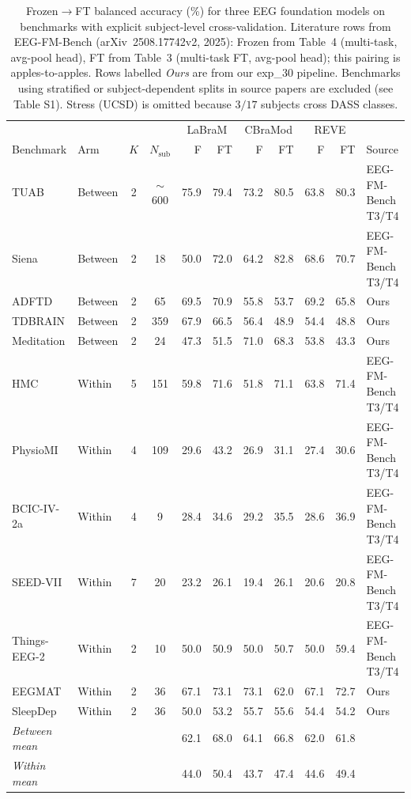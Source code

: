 \begin{table}[t]
\centering
\caption{Frozen$\rightarrow$FT balanced accuracy (\%) for three EEG foundation models on benchmarks with explicit subject-level cross-validation. Literature rows from EEG-FM-Bench (arXiv~2508.17742v2, 2025): Frozen from Table~4 (multi-task, avg-pool head), FT from Table~3 (multi-task FT, avg-pool head); this pairing is apples-to-apples. Rows labelled \emph{Ours} are from our exp\_30 pipeline. Benchmarks using stratified or subject-dependent splits in source papers are excluded (see Table S1). Stress (UCSD) is omitted because $3/17$ subjects cross DASS classes.}
\label{tab:benchmark_gap}
\begin{tabular}{llccrrrrrrl}
\toprule
 & & & & \multicolumn{2}{c}{LaBraM} & \multicolumn{2}{c}{CBraMod} & \multicolumn{2}{c}{REVE} & \\
\cmidrule(lr){5-6}\cmidrule(lr){7-8}\cmidrule(lr){9-10}
Benchmark & Arm & $K$ & $N_{\mathrm{sub}}$ & F & FT & F & FT & F & FT & Source \\
\midrule
TUAB & Between & 2 & $\sim$600 & 75.9 & 79.4 & 73.2 & 80.5 & 63.8 & 80.3 & EEG-FM-Bench T3/T4 \\
Siena & Between & 2 & 18 & 50.0 & 72.0 & 64.2 & 82.8 & 68.6 & 70.7 & EEG-FM-Bench T3/T4 \\
ADFTD & Between & 2 & 65 & 69.5 & 70.9 & 55.8 & 53.7 & 69.2 & 65.8 & Ours \\
TDBRAIN & Between & 2 & 359 & 67.9 & 66.5 & 56.4 & 48.9 & 54.4 & 48.8 & Ours \\
Meditation & Between & 2 & 24 & 47.3 & 51.5 & 71.0 & 68.3 & 53.8 & 43.3 & Ours \\
\midrule
HMC & Within & 5 & 151 & 59.8 & 71.6 & 51.8 & 71.1 & 63.8 & 71.4 & EEG-FM-Bench T3/T4 \\
PhysioMI & Within & 4 & 109 & 29.6 & 43.2 & 26.9 & 31.1 & 27.4 & 30.6 & EEG-FM-Bench T3/T4 \\
BCIC-IV-2a & Within & 4 & 9 & 28.4 & 34.6 & 29.2 & 35.5 & 28.6 & 36.9 & EEG-FM-Bench T3/T4 \\
SEED-VII & Within & 7 & 20 & 23.2 & 26.1 & 19.4 & 26.1 & 20.6 & 20.8 & EEG-FM-Bench T3/T4 \\
Things-EEG-2 & Within & 2 & 10 & 50.0 & 50.9 & 50.0 & 50.7 & 50.0 & 59.4 & EEG-FM-Bench T3/T4 \\
EEGMAT & Within & 2 & 36 & 67.1 & 73.1 & 73.1 & 62.0 & 67.1 & 72.7 & Ours \\
SleepDep & Within & 2 & 36 & 50.0 & 53.2 & 55.7 & 55.6 & 54.4 & 54.2 & Ours \\
\midrule
\emph{Between mean} & & & & 62.1 & 68.0 & 64.1 & 66.8 & 62.0 & 61.8 & \\
\emph{Within mean}  & & & & 44.0 & 50.4 & 43.7 & 47.4 & 44.6 & 49.4 & \\
\bottomrule
\end{tabular}
\end{table}
